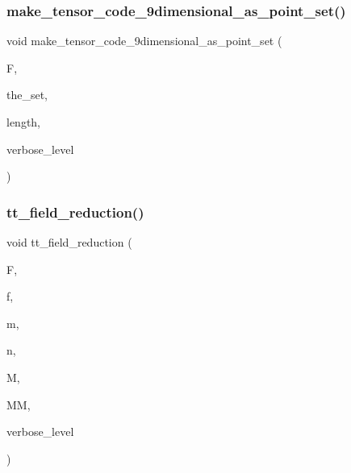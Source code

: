 \subsubsection{\texorpdfstring{make\+\_\+tensor\+\_\+code\+\_\+9dimensional\+\_\+as\+\_\+point\+\_\+set()}{make\_tensor\_code\_9dimensional\_as\_point\_set()}}
{\footnotesize\ttfamily void make\+\_\+tensor\+\_\+code\+\_\+9dimensional\+\_\+as\+\_\+point\+\_\+set (\begin{DoxyParamCaption}\item[{\mbox{\hyperlink{classfinite__field}{finite\+\_\+field}} $\ast$}]{F,  }\item[{\mbox{\hyperlink{galois_8h_a09fddde158a3a20bd2dcadb609de11dc}{I\+NT}} $\ast$\&}]{the\+\_\+set,  }\item[{\mbox{\hyperlink{galois_8h_a09fddde158a3a20bd2dcadb609de11dc}{I\+NT}} \&}]{length,  }\item[{\mbox{\hyperlink{galois_8h_a09fddde158a3a20bd2dcadb609de11dc}{I\+NT}}}]{verbose\+\_\+level }\end{DoxyParamCaption})}

\mbox{\label{tensor_8_c_ae4e2c39ff1b745f764e7aa808ea809ed}} 
\subsubsection{\texorpdfstring{tt\+\_\+field\+\_\+reduction()}{tt\_field\_reduction()}}
{\footnotesize\ttfamily void tt\+\_\+field\+\_\+reduction (\begin{DoxyParamCaption}\item[{\mbox{\hyperlink{classfinite__field}{finite\+\_\+field}} \&}]{F,  }\item[{\mbox{\hyperlink{classfinite__field}{finite\+\_\+field}} \&}]{f,  }\item[{\mbox{\hyperlink{galois_8h_a09fddde158a3a20bd2dcadb609de11dc}{I\+NT}}}]{m,  }\item[{\mbox{\hyperlink{galois_8h_a09fddde158a3a20bd2dcadb609de11dc}{I\+NT}}}]{n,  }\item[{\mbox{\hyperlink{galois_8h_a09fddde158a3a20bd2dcadb609de11dc}{I\+NT}} $\ast$}]{M,  }\item[{\mbox{\hyperlink{galois_8h_a09fddde158a3a20bd2dcadb609de11dc}{I\+NT}} $\ast$}]{MM,  }\item[{\mbox{\hyperlink{galois_8h_a09fddde158a3a20bd2dcadb609de11dc}{I\+NT}}}]{verbose\+\_\+level }\end{DoxyParamCaption})}


